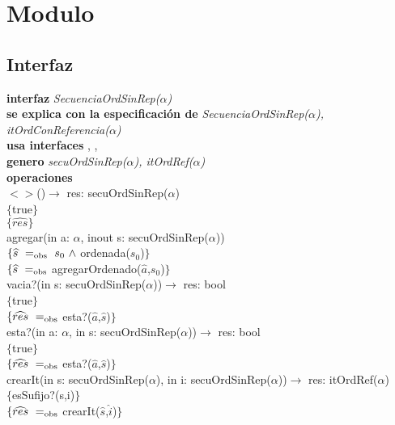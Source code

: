 \section*{Modulo }

\subsection*{Interfaz}
\textbf{interfaz} \textit{SecuenciaOrdSinRep($\alpha$)}\\
\textbf{se explica con la especificaci\'on de} \textit{SecuenciaOrdSinRep($\alpha$), itOrdConReferencia($\alpha$)}\\
\textbf{usa interfaces} , \nombretad{$\alpha$}, \\
\textbf{genero} \textit{secuOrdSinRep($\alpha$), itOrdRef($\alpha$)}\\
\textbf{operaciones}\\

$<>$()$\longrightarrow$ res: secuOrdSinRep($\alpha$)\\
$\{$true$\}$\\
$\{\widehat{res}\}$\\

agregar(in a: $\alpha$, inout s: secuOrdSinRep($\alpha$))\\
$\{\widehat{s}\ =_{\mathrm{obs}}\ s_0\ \wedge$ ordenada($s_0$)$\}$\\
$\{\widehat{s}\ =_{\mathrm{obs}}$ agregarOrdenado($\widehat{a}$,$s_0$)$\}$\\

vacia?(in s: secuOrdSinRep($\alpha$))$\longrightarrow$ res: bool\\
$\{$true$\}$\\
$\{\widehat{res}\ =_{\mathrm{obs}}$ esta?($\widehat{a}$,$\widehat{s}$)$\}$\\

esta?(in a: $\alpha$, in s: secuOrdSinRep($\alpha$))$\longrightarrow$ res: bool\\
$\{$true$\}$\\
$\{\widehat{res}\ =_{\mathrm{obs}}$ esta?($\widehat{a}$,$\widehat{s}$)$\}$\\

crearIt(in s: secuOrdSinRep($\alpha$), in i: secuOrdSinRep($\alpha$))$\longrightarrow$ res: itOrdRef($\alpha$)\\
$\{$esSufijo?(s,i)$\}$\\
$\{\widehat{res}\ =_{\mathrm{obs}}$ crearIt($\widehat{s}$,$\widehat{i}$)$\}$\\

